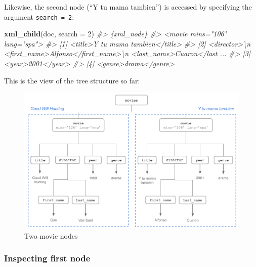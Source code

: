 \documentclass[
]{book}
\newenvironment{Shaded}{\begin{snugshade}}{\end{snugshade}}
\newcommand{\AttributeTok}[1]{\textcolor[rgb]{0.13,0.29,0.53}{#1}}
\newcommand{\CommentTok}[1]{\textcolor[rgb]{0.56,0.35,0.01}{\textit{#1}}}
\newcommand{\DecValTok}[1]{\textcolor[rgb]{0.00,0.00,0.81}{#1}}
\newcommand{\FunctionTok}[1]{\textcolor[rgb]{0.13,0.29,0.53}{\textbf{#1}}}
\newcommand{\NormalTok}[1]{#1}
\begin{document}
Likewise, the second node (``Y tu mama tambien'') is accessed by specifying the
argument \texttt{search\ =\ 2}:

\begin{Shaded}
\begin{Highlighting}[]
\FunctionTok{xml\_child}\NormalTok{(doc, }\AttributeTok{search =} \DecValTok{2}\NormalTok{)}
\CommentTok{\#\textgreater{} \{xml\_node\}}
\CommentTok{\#\textgreater{} \textless{}movie mins="106" lang="spa"\textgreater{}}
\CommentTok{\#\textgreater{} [1] \textless{}title\textgreater{}Y tu mama tambien\textless{}/title\textgreater{}}
\CommentTok{\#\textgreater{} [2] \textless{}director\textgreater{}\textbackslash{}n  \textless{}first\_name\textgreater{}Alfonso\textless{}/first\_name\textgreater{}\textbackslash{}n  \textless{}last\_name\textgreater{}Cuaron\textless{}/last ...}
\CommentTok{\#\textgreater{} [3] \textless{}year\textgreater{}2001\textless{}/year\textgreater{}}
\CommentTok{\#\textgreater{} [4] \textless{}genre\textgreater{}drama\textless{}/genre\textgreater{}}
\end{Highlighting}
\end{Shaded}

This is the view of the tree structure so far:

\begin{figure}

{\centering \includegraphics[width=0.85\linewidth]{images/xml/xml-movies-tree2} 

}

\caption{Two movie nodes}\label{fig:unnamed-chunk-34}
\end{figure}

\hypertarget{inspecting-first-node}{%
\subsubsection*{Inspecting first node}\label{inspecting-first-node}}
\end{document}
